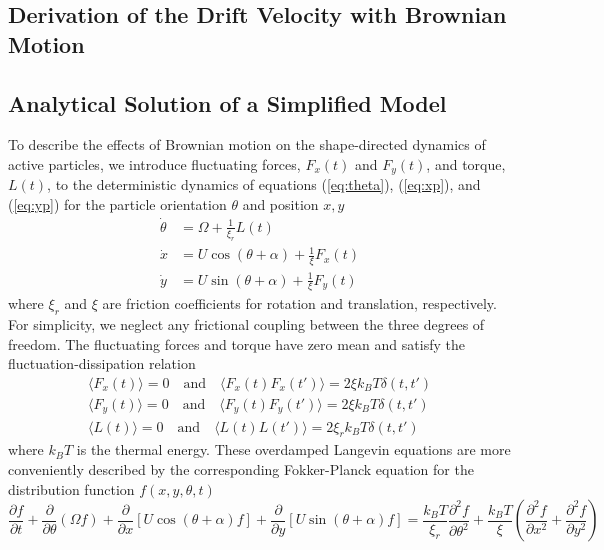 \begin{appendices}
\clearpage
\section{Derivation of the Drift Velocity with Brownian Motion}

\subsection{Analytical Solution of a Simplified Model}

To describe the effects of Brownian motion on the shape-directed dynamics of active particles, we introduce fluctuating forces, $F_x(t)$ and $F_y(t)$, and torque, $L(t)$, to the deterministic dynamics of equations (\ref{eq:theta}), (\ref{eq:xp}), and (\ref{eq:yp}) for the particle orientation $\theta$ and position $x,y$
\begin{align}
    \dot{\theta} &= \Omega + \frac{1}{\xi_r}L(t) \label{eq:langevin1}
    \\ 
    \dot{x} &= U \cos(\theta + \alpha)  + \frac{1}{\xi}F_x(t)  
    \\ 
    \dot{y} &= U \sin(\theta + \alpha) + \frac{1}{\xi}F_y(t) \label{eq:langevin3}
\end{align}	
where $\xi_r$ and $\xi$ are friction coefficients for rotation and translation, respectively.  For simplicity, we neglect any frictional coupling between the three degrees of freedom.  The fluctuating forces and torque have zero mean and satisfy the fluctuation-dissipation relation
\begin{gather}
    \langle F_x(t) \rangle = 0 \quad \text{and} \quad \langle F_x(t)F_x(t') \rangle = 2\xi k_B T\delta(t,t')
    \\
    \langle F_y(t) \rangle = 0 \quad \text{and} \quad \langle F_y(t)F_y(t') \rangle = 2\xi k_B T\delta(t,t')
    \\
    \langle L(t) \rangle = 0 \quad \text{and} \quad \langle L(t)L(t') \rangle = 2\xi_r k_B T\delta(t,t')
\end{gather}
where $k_B T$ is the thermal energy.  These overdamped Langevin equations are more conveniently described by the corresponding Fokker-Planck equation for the distribution function $f(x,y,\theta,t)$
\begin{equation}
    \frac{\partial f}{\partial t} + \frac{\partial}{\partial \theta}(\Omega f) + \frac{\partial}{\partial x}\left[ U \cos(\theta+\alpha)f\right] + \frac{\partial}{\partial y}\left[ U \sin(\theta+\alpha)f\right] =  \frac{k_B T}{\xi_r}\frac{\partial^2f}{\partial \theta^2} + \frac{k_B T}{\xi} \left(\frac{\partial^2 f}{\partial x^2}+ \frac{\partial^2 f}{\partial y^2}\right)
\end{equation}


\end{appendices}
